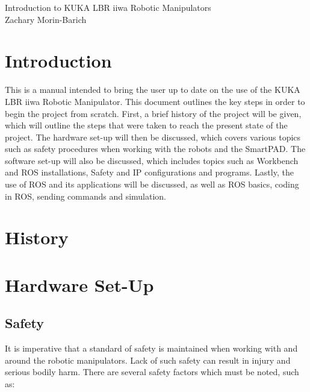 \documentclass[12pt, letterpaper]{article}
\begin{document}
\begin{center}
    \huge{Introduction to KUKA LBR iiwa Robotic Manipulators} \\[10pt]
    \large{Zachary Morin-Barich}
\end{center}









\section{Introduction}

This is a manual intended to bring the user up to date on the use of the KUKA LBR iiwa Robotic Manipulator. This document outlines the key steps in order to begin the project from scratch. First, a brief history of the project will be given, which will outline the steps that were taken to reach the present state of the project. The hardware set-up will then be discussed, which covers various topics such as safety procedures when working with the robots and the SmartPAD. The software set-up will also be discussed, which includes topics such as Workbench and ROS installations, Safety and IP configurations and programs. Lastly, the use of ROS and its applications will be discussed, as well as ROS basics, coding in ROS, sending commands and simulation.





\section{History}










\section{Hardware Set-Up}
\subsection{Safety}
It is imperative that a standard of safety is maintained when working with and around the robotic manipulators. Lack of such safety can result in injury and serious bodily harm. There are several safety factors which must be noted, such as:
\end{document}
